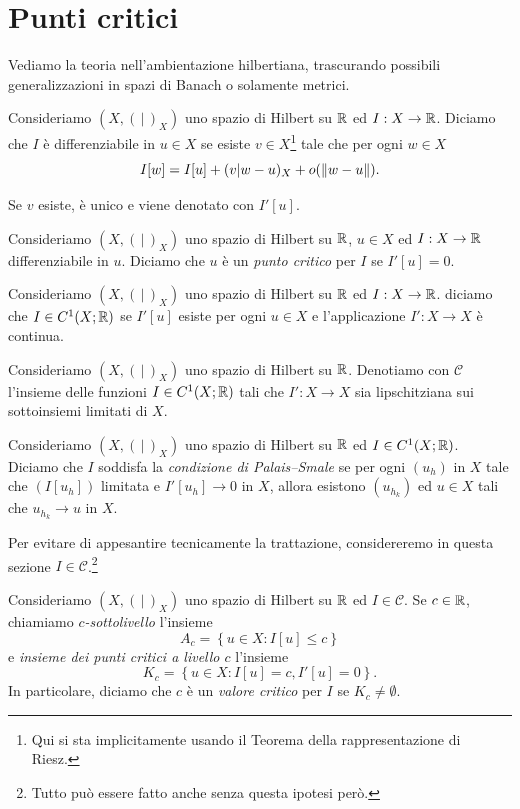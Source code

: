 \section{Punti critici}
Vediamo la teoria nell'ambientazione hilbertiana, trascurando possibili generalizzazioni in spazi di Banach o solamente metrici.
\begin{definizione}
	Consideriamo $(X, (\,|\,)_X)$ uno spazio di Hilbert su $\mathbb{R}$ ed $I: X \to \mathbb{R}$. Diciamo che $I$ è differenziabile in $u \in X$ se esiste $v \in X$\footnote{Qui si sta implicitamente usando il Teorema della rappresentazione di Riesz.} tale che per ogni $w \in X$
	\[ I[w] = I[u] + (v|w-u)_X + o(\lVert w-u\rVert). \]
\end{definizione}
Se $v$ esiste, è unico e viene denotato con $I'[u]$.
\begin{definizione}
	Consideriamo $(X, (\,|\,)_X)$ uno spazio di Hilbert su $\mathbb{R}$, $u \in X$ ed $I: X \to \mathbb{R}$ differenziabile in $u$. Diciamo che $u$ è un \emph{punto critico} per $I$  se $I'[u]=0$.
\end{definizione}
\begin{definizione}
	Consideriamo $(X, (\,|\,)_X)$ uno spazio di Hilbert su $\mathbb{R}$ ed $I: X \to \mathbb{R}$. diciamo che $I \in C^1(X;\mathbb{R})$ se $I'[u]$ esiste per ogni $u \in X$ e l'applicazione $I':X \to X$ è continua.
\end{definizione}
\begin{notazione}
	Consideriamo $(X, (\,|\,)_X)$ uno spazio di Hilbert su $\mathbb{R}$. Denotiamo con $\mathcal{C}$ l'insieme delle funzioni $I \in C^1(X;\mathbb{R})$ tali che $I':X \to X$ sia lipschitziana sui sottoinsiemi limitati di $X$.
\end{notazione}
\begin{definizione}
	Consideriamo $(X, (\,|\,)_X)$ uno spazio di Hilbert su $\mathbb{R}$ ed $I \in C^1(X;\mathbb{R})$. Diciamo che $I$ soddisfa la \emph{condizione di Palais--Smale} se per ogni $(u_h)$ in $X$ tale che $(I[u_h])$ limitata e $I'[u_h] \to 0$ in $X$, allora esistono $(u_{h_k})$ ed $u \in X$ tali che $u_{h_k} \to u$ in $X$. 
\end{definizione}
Per evitare di appesantire tecnicamente la trattazione, considereremo in questa sezione $I \in \mathcal{C}$.\footnote{Tutto può essere fatto anche senza questa ipotesi però.} 

\begin{definizione}
	Consideriamo $(X, (\,|\,)_X)$ uno spazio di Hilbert su $\mathbb{R}$ ed $I \in \mathcal{C}$. Se $c \in \mathbb{R}$, chiamiamo \emph{$c$-sottolivello} l'insieme 
	\[ A_c = \left\lbrace u \in X : I[u]\le c\right\rbrace  \]
	e \emph{insieme dei punti critici a livello $c$} l'insieme 
	\[ K_c =\left\lbrace u \in X : I[u]= c, I'[u]=0\right\rbrace. \]
	In particolare, diciamo che $c$ è un \emph{valore critico} per $I$ se $K_c \ne \emptyset$.
\end{definizione}

